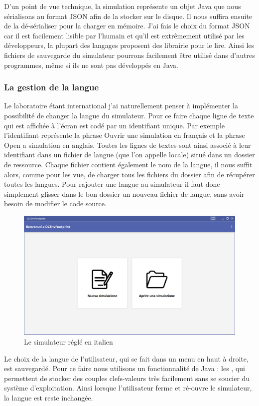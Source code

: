 D'un point de vue technique, la simulation représente un objet Java que nous sérialisons au format JSON afin de la stocker sur le disque. Il nous suffira ensuite de la dé-sérialiser pour la charger en mémoire. J'ai fais le choix du format JSON car il est facilement lisible par l'humain et qu'il est extrêmement utilisé par les développeurs, la plupart des langages proposent des librairie pour le lire. Ainsi les fichiers de sauvegarde du simulateur pourrons facilement être utilisé dans d'autres programmes, même si ils ne sont pas développés en Java.

\subsubsection{La gestion de la langue}
Le laboratoire étant international j'ai naturellement penser à implémenter la possibilité de changer la langue du simulateur. Pour ce faire chaque ligne de texte qui est affichée à l'écran est codé par un identifiant unique. Par exemple l'identifiant  représente la phrase \og Ouvrir une simulation \fg{} en français et la phrase \og Open a simulation \fg{} en anglais. Toutes les lignes de textes sont ainsi associé à leur identifiant dans un fichier de langue (que l'on appelle locale) situé dans un dossier de ressource. Chaque fichier contient également le nom de la langue, il nous suffit alors, comme pour les vue, de charger tous les fichiers du dossier afin de récupérer toutes les langues. Pour rajouter une langue au simulateur il faut donc simplement glisser dans le bon dossier un nouveau fichier de langue, sans avoir besoin de modifier le code source.

\begin{figure}[h]
	\begin{center}
		\includegraphics[scale=0.50]{partie2/images/italien.png}
		\caption{Le simulateur réglé en italien}
	\end{center}
\end{figure}
Le choix de la langue de l'utilisateur, qui se fait dans un menu en haut à droite, est sauvegardé. Pour ce faire nous utilisons un fonctionnalité de Java : les , qui permettent de stocker des couples clefs-valeurs très facilement sans se soucier du système d'exploitation. Ainsi lorsque l'utilisateur ferme et ré-ouvre le simulateur, la langue est reste inchangée.

